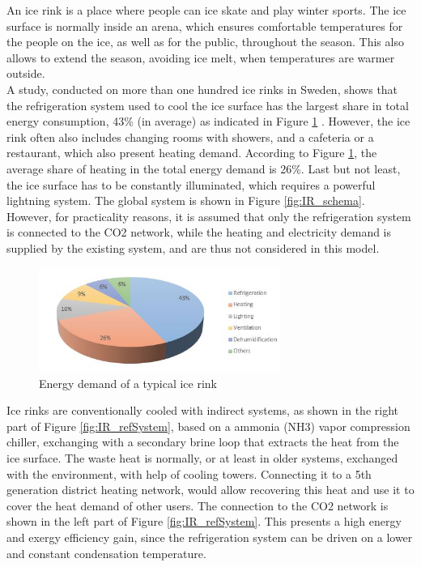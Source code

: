 \documentclass{article}
\begin{document}
An ice rink is a place where people can ice skate and play winter sports. The ice surface is normally inside an arena, which ensures comfortable temperatures for the people on the ice, as well as for the public, throughout the season. This also allows to extend the season, avoiding ice melt, when temperatures are warmer outside.\\

A study, conducted on more than one hundred ice rinks in Sweden, shows that the refrigeration system used to cool the ice surface has the largest share in total energy consumption, 43\% (in average) as indicated in Figure \ref{fig:IR_energyDemand} \cite{karampourMEASUREMENTMODELLINGICE}. 
However, the ice rink often also includes changing rooms with showers, and a cafeteria or a restaurant, which also present heating demand. According to Figure \ref{fig:IR_energyDemand}, the average share of heating in the total energy demand is 26\%.
Last but not least, the ice surface has to be constantly illuminated, which requires a powerful lightning system. The global system is shown in Figure \ref{fig:IR_schema}.\\

However, for practicality reasons, it is assumed that only the refrigeration system is connected to the CO2 network, while the heating and electricity demand is supplied by the existing system, and are thus not considered in this model.

\begin{figure}[htp]
	\centering
	\includegraphics[width=0.7\textwidth]{IR_energyDemand.JPG}
	\caption{Energy demand of a typical ice rink \cite{karampourMEASUREMENTMODELLINGICE}}
	\label{fig:IR_energyDemand}
\end{figure}

Ice rinks are conventionally cooled with indirect systems, as shown in the right part of Figure \ref{fig:IR_refSystem}, based on a ammonia (NH3) vapor compression chiller, exchanging with a secondary brine loop that extracts the heat from the ice surface. The waste heat is normally, or at least in older systems, exchanged with the environment, with help of cooling towers. Connecting it to a 5th generation district heating network, would allow recovering this heat and use it to cover the heat demand of other users. The connection to the CO2 network is shown in the left part of Figure \ref{fig:IR_refSystem}. This presents a high energy and exergy efficiency gain, since the refrigeration system can be driven on a lower and constant condensation temperature.\\
\end{document}
